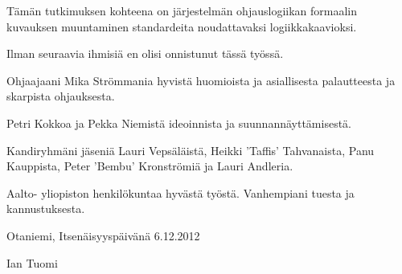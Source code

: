 \documentclass[finnish,12pt]{article}
\begin{document}
	
	


	\author{Ian Tuomi}

	
	\begin{abstractpage}[finnish]
  
Tämän tutkimuksen kohteena on järjestelmän ohjauslogiikan formaalin kuvauksen
muuntaminen standardeita noudattavaksi logiikkakaavioksi.
  
	\end{abstractpage}

	\newpage
	\vspace{10cm}

Ilman seuraavia ihmisiä en olisi onnistunut tässä työssä.

Ohjaajaani Mika Strömmania hyvistä huomioista ja asiallisesta palautteesta ja skarpista ohjauksesta.

Petri Kokkoa ja Pekka Niemistä ideoinnista ja suunnannäyttämisestä.

Kandiryhmäni jäseniä Lauri Vepsäläistä, Heikki 'Taffis' Tahvanaista, Panu Kauppista, Peter 'Bembu'  Kronströmiä ja Lauri Andleria.

Aalto- yliopiston henkilökuntaa hyvästä työstä.
Vanhempiani tuesta ja kannustuksesta.

	\vspace{5cm}

Otaniemi, 
Itsenäisyyspäivänä 6.12.2012

	\vspace{5mm}
	{\hfill Ian Tuomi \hspace{1cm}}

	\newpage


	\tableofcontents


\end{document}
